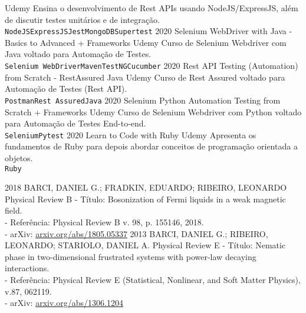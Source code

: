 \documentclass[9pt]{developercv} %
\begin{document}
\begin{entrylist}
		{Udemy}
		{Ensina o desenvolvimento de Rest APIs usando NodeJS/ExpressJS, além de discutir testes unitários e de integração.\\
		\texttt{NodeJS}\slashsep\texttt{ExpressJS}\slashsep\texttt{Jest}\slashsep\texttt{MongoDB}\slashsep\texttt{Supertest}}	
	\entry
		{2020}%
		{Selenium WebDriver with Java - Basics to Advanced + Frameworks}
		{Udemy}
		{Curso de Selenium Webdriver com Java voltado para Automação de Testes.\\ 
		\texttt{Selenium WebDriver}\slashsep\texttt{Maven}\slashsep\texttt{TestNG}\slashsep\texttt{Cucumber}}
	\entry
		{2020}%
		{Rest API Testing (Automation) from Scratch - RestAssured Java}
		{Udemy}
		{Curso de Rest Assured voltado para Automação de Testes (Rest API).\\
		\texttt{Postman}\slashsep\texttt{Rest Assured}\slashsep\texttt{Java}}
	\entry
		{2020}%
		{Selenium Python Automation Testing from Scratch + Frameworks}
		{Udemy}
		{Curso de Selenium Webdriver com Python voltado para Automação de Testes End-to-end.\\ 
		\texttt{Selenium}\slashsep\texttt{Pytest}}
	\entry
		{2020}
		{Learn to Code with Ruby}
		{Udemy}
		{Apresenta os fundamentos de Ruby para depois abordar conceitos de programação orientada a objetos.\\ 
		\texttt{Ruby}}
\end{entrylist}



\newpage
{}

\begin{entrylist}
	\entry
	{2018}
	{BARCI, DANIEL G.; FRADKIN, EDUARDO; RIBEIRO, LEONARDO}
	{Physical Review B}
	{- Título: Bosonization of Fermi liquids in a weak magnetic field.\\
	- Referência: Physical Review B v. 98, p. 155146, 2018.\\
	- arXiv: \href{https://arxiv.org/abs/1805.05337}{arxiv.org/abs/1805.05337} }
	\entry
	{2013}
	{BARCI, DANIEL G.; RIBEIRO, LEONARDO; STARIOLO, DANIEL A.}
	{Physical Review E}
	{- Título: Nematic phase in two-dimensional frustrated systems with power-law decaying interactions.\\
	- Referência: Physical Review E (Statistical, Nonlinear, and Soft Matter Physics), v.87, 062119.\\
	- arXiv: \href{http://arxiv.org/abs/1306.1204}{arxiv.org/abs/1306.1204} }
\end{entrylist}
\end{document}
